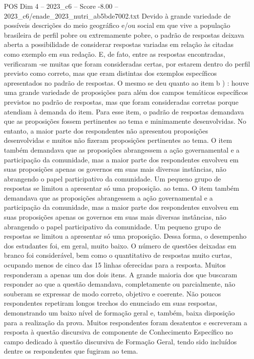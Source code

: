 \begin{textsample}{POS Dim 4 – 2023\_c6 – Score -8.00 – 2023\_c6/enade\_2023\_nutri\_ab5bde7002.txt}
Devido à grande variedade de possíveis descrições do meio geográfico e/ou social em que vive a população brasileira de perfil pobre ou extremamente pobre, o padrão de respostas deixava aberta a possibilidade de considerar respostas variadas em relação às citadas como exemplo em sua redação.
E, de fato, entre as respostas encontradas, verificaram -se muitas que foram consideradas certas, por estarem dentro do perfil previsto como correto, mas que eram distintas dos exemplos específicos apresentados no padrão de respostas.
O mesmo se deu quanto ao item b ) : houve uma grande variedade de proposições para além dos campos temáticos específicos previstos no padrão de respostas, mas que foram consideradas corretas porque atendiam à demanda do item.
Para esse item, o padrão de respostas demandava que as proposições fossem pertinentes ao tema e minimamente desenvolvidas.
No entanto, a maior parte dos respondentes não apresentou proposições desenvolvidas e muitos não fizeram proposições pertinentes ao tema.
O item também demandava que as proposições abrangessem a ação governamental e a participação da comunidade, mas a maior parte dos respondentes envolveu em suas proposições apenas os governos em suas mais diversas instâncias, não abrangendo o papel participativo da comunidade.
Um pequeno grupo de respostas se limitou a apresentar só uma proposição. ao tema.
O item também demandava que as proposições abrangessem a ação governamental e a participação da comunidade, mas a maior parte dos respondentes envolveu em suas proposições apenas os governos em suas mais diversas instâncias, não abrangendo o papel participativo da comunidade.
Um pequeno grupo de respostas se limitou a apresentar só uma proposição.
Dessa forma, o desempenho dos estudantes foi, em geral, muito baixo.
O número de questões deixadas em branco foi considerável, bem como o quantitativo de respostas muito curtas, ocupando menos de cinco das 15 linhas oferecidas para a resposta.
Muitos responderam a apenas um dos dois itens.
A grande maioria dos que buscaram responder ao que a questão demandava, completamente ou parcialmente, não souberam se expressar de modo correto, objetivo e coerente.
Não poucos respondentes repetiram longos trechos do enunciado em suas respostas, demonstrando um baixo nível de formação geral e, também, baixa disposição para a realização da prova.
Muitos respondentes foram desatentos e escreveram a resposta à questão discursiva de componente de Conhecimento Específico no campo dedicado à questão discursiva de Formação Geral, tendo sido incluídos dentre os respondentes que fugiram ao tema.

\end{textsample}
